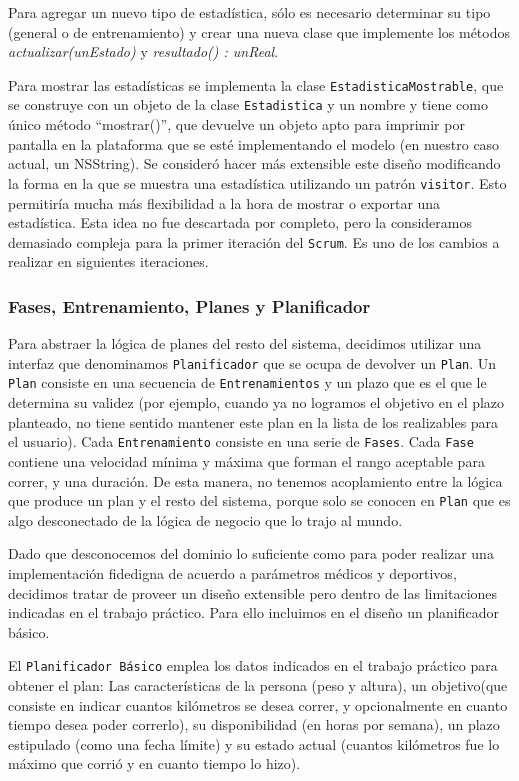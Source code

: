 \documentclass[10pt, a4paper,english,spanish]{article}
\begin{document}
Para agregar un nuevo tipo de estadística, sólo es necesario determinar su tipo (general o de entrenamiento) y crear una nueva clase que implemente los métodos \emph{actualizar(unEstado)} y \emph{resultado() : unReal}.

Para mostrar las estadísticas se implementa la clase \texttt{EstadisticaMostrable}, que se construye con un objeto de la clase \texttt{Estadistica} y un nombre y tiene como único método ``mostrar()'', que devuelve un objeto apto para imprimir por pantalla en la plataforma que se esté implementando el modelo (en nuestro caso actual, un NSString). Se consideró hacer más extensible este diseño modificando la forma en la que se muestra una estadística utilizando un patrón \texttt{visitor}. Esto permitiría mucha más flexibilidad a la hora de mostrar o exportar una estadística. Esta idea no fue descartada por completo, pero la consideramos demasiado compleja para la primer iteración del \texttt{Scrum}. Es uno de los cambios a realizar en siguientes iteraciones.

\subsubsection{Fases, Entrenamiento, Planes y Planificador}
Para abstraer la lógica de planes del resto del sistema, decidimos utilizar una interfaz que denominamos \texttt{Planificador} que se ocupa de devolver un \texttt{Plan}. Un \texttt{Plan} consiste en una secuencia de \texttt{Entrenamientos} y un plazo que es el que le determina su validez (por ejemplo, cuando ya no logramos el objetivo en el plazo planteado, no tiene sentido mantener este plan en la lista de los realizables para el usuario). Cada \texttt{Entrenamiento} consiste en una serie de \texttt{Fases}. Cada \texttt{Fase} contiene una velocidad mínima y máxima que forman el rango aceptable para correr, y una duración. De esta manera, no tenemos acoplamiento entre la lógica que produce un plan y el resto del sistema, porque solo se conocen en \texttt{Plan} que es algo desconectado de la lógica de negocio que lo trajo al mundo.

Dado que desconocemos del dominio lo suficiente como para poder realizar una implementación fidedigna de acuerdo a parámetros médicos y deportivos, decidimos tratar de proveer un dise\~no extensible pero dentro de las limitaciones indicadas en el trabajo práctico. Para ello incluimos en el dise\~no un planificador básico.

El \texttt{Planificador Básico} emplea los datos indicados en el trabajo práctico para obtener el plan: Las características de la persona (peso y altura), un objetivo(que consiste en indicar cuantos kilómetros se desea correr, y opcionalmente en cuanto tiempo desea poder correrlo), su disponibilidad (en horas por semana), un plazo estipulado (como una fecha límite) y su estado actual (cuantos kilómetros fue lo máximo que corrió y en cuanto tiempo lo hizo).
\end{document}
